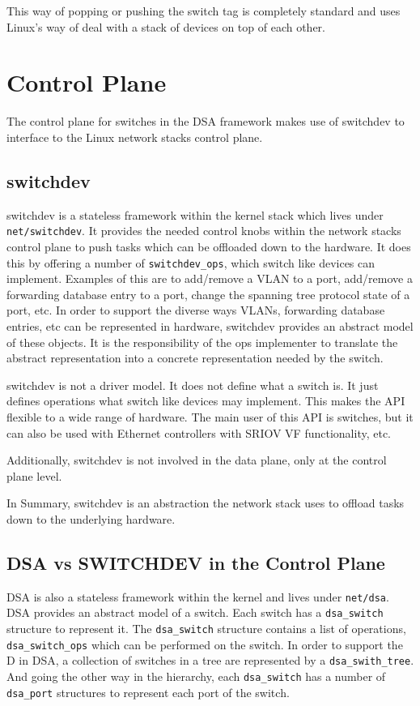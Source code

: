 \documentclass[letterpaper]{article}
\begin{document}
This way of popping or pushing the switch tag is completely standard
and uses Linux's way of deal with a stack of devices on top of each
other.

\section{Control Plane}

The control plane for switches in the DSA framework makes use of
switchdev to interface to the Linux network stacks control plane.

\subsection{switchdev}

switchdev is a stateless framework within the kernel stack which lives
under \verb|net/switchdev|. It provides the needed control knobs
within the network stacks control plane to push tasks which can be
offloaded down to the hardware. It does this by offering a number of
\verb|switchdev_ops|, which switch like devices can
implement. Examples of this are to add/remove a VLAN to a port,
add/remove a forwarding database entry to a port, change the spanning
tree protocol state of a port, etc. In order to support the diverse
ways VLANs, forwarding database entries, etc can be represented in
hardware, switchdev provides an abstract model of these objects. It is
the responsibility of the ops implementer to translate the abstract
representation into a concrete representation needed by the switch.

switchdev is not a driver model. It does not define what a switch
is. It just defines operations what switch like devices may
implement. This makes the API flexible to a wide range of
hardware. The main user of this API is switches, but it can also be
used with Ethernet controllers with SRIOV VF functionality, etc.

Additionally, switchdev is not involved in the data plane, only at the
control plane level.

In Summary, switchdev is an abstraction the network stack uses to
offload tasks down to the underlying hardware.

\subsection{DSA vs SWITCHDEV in the Control Plane}

DSA is also a stateless framework within the kernel and lives under
\verb|net/dsa|. DSA provides an abstract model of a switch. Each
switch has a \verb|dsa_switch| structure to represent it. The
\verb|dsa_switch| structure contains a list of operations,
\verb|dsa_switch_ops| which can be performed on the switch. In order
to support the D in DSA, a collection of switches in a tree are
represented by a \verb|dsa_swith_tree|. And going the other way in the
hierarchy, each \verb|dsa_switch| has a number of \verb|dsa_port|
structures to represent each port of the switch.
\end{document}
